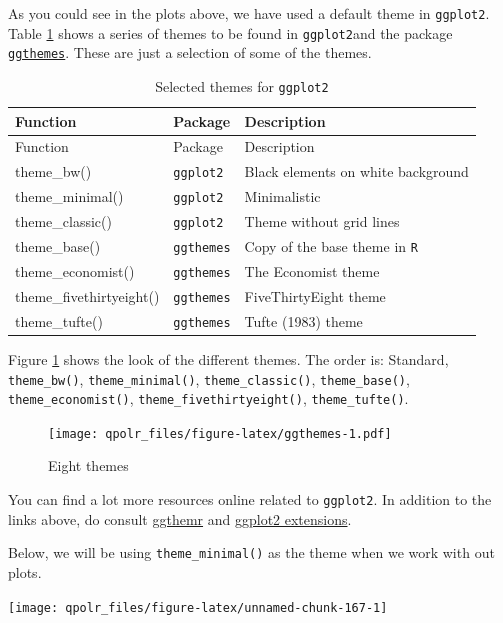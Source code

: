 \documentclass[12pt,oneside]{reedthesis}
\theoremstyle{definition}
\theoremstyle{definition}
\theoremstyle{definition}
\theoremstyle{remark}
\begin{document}
  As you could see in the plots above, we have used a default theme in
  \texttt{ggplot2}. Table \ref{tab:ggthemes} shows a series of themes to
  be found in \texttt{ggplot2}and the package
  \href{https://cran.r-project.org/web/packages/ggthemes/vignettes/ggthemes.html}{\texttt{ggthemes}}.
  These are just a selection of some of the themes.
  \begin{longtable}[]{@{}lll@{}}
  \caption{\label{tab:ggthemes} Selected themes for
  \texttt{ggplot2}}\tabularnewline
  \toprule
  Function & Package & Description\tabularnewline
  \midrule
  \endfirsthead
  \toprule
  Function & Package & Description\tabularnewline
  \midrule
  \endhead
  theme\_bw() & \texttt{ggplot2} & Black elements on white
  background\tabularnewline
  theme\_minimal() & \texttt{ggplot2} & Minimalistic\tabularnewline
  theme\_classic() & \texttt{ggplot2} & Theme without grid
  lines\tabularnewline
  theme\_base() & \texttt{ggthemes} & Copy of the base theme in
  \texttt{R}\tabularnewline
  theme\_economist() & \texttt{ggthemes} & The Economist
  theme\tabularnewline
  theme\_fivethirtyeight() & \texttt{ggthemes} & FiveThirtyEight
  theme\tabularnewline
  theme\_tufte() & \texttt{ggthemes} & Tufte (1983) theme\tabularnewline
  \bottomrule
  \end{longtable}
  Figure \ref{fig:ggthemes} shows the look of the different themes. The
  order is: Standard, \texttt{theme\_bw()}, \texttt{theme\_minimal()},
  \texttt{theme\_classic()}, \texttt{theme\_base()},
  \texttt{theme\_economist()}, \texttt{theme\_fivethirtyeight()},
  \texttt{theme\_tufte()}.
  \begin{figure}
  \centering
  \texttt{[image: qpolr\_files/figure-latex/ggthemes-1.pdf]}
  \caption{\label{fig:ggthemes}Eight themes}
  \end{figure}
  You can find a lot more resources online related to \texttt{ggplot2}. In
  addition to the links above, do consult
  \href{https://github.com/cttobin/ggthemr}{ggthemr} and
  \href{https://www.ggplot2-exts.org/}{ggplot2 extensions}.
  
  Below, we will be using \texttt{theme\_minimal()} as the theme when we
  work with out plots.
  \begin{Shaded}
  \begin{Highlighting}[]
  \NormalTok{(}\OperatorTok{+}
  \StringTok{  }\NormalTok{(} \NormalTok{) }\OperatorTok{+}\StringTok{ }
  \StringTok{  }\NormalTok{(}\NormalTok{) }\OperatorTok{+}
  \StringTok{  }\NormalTok{()}
  \end{Highlighting}
  \end{Shaded}
  \begin{center}\texttt{[image: qpolr\_files/figure-latex/unnamed-chunk-167-1]} \end{center}
  
\end{document}
